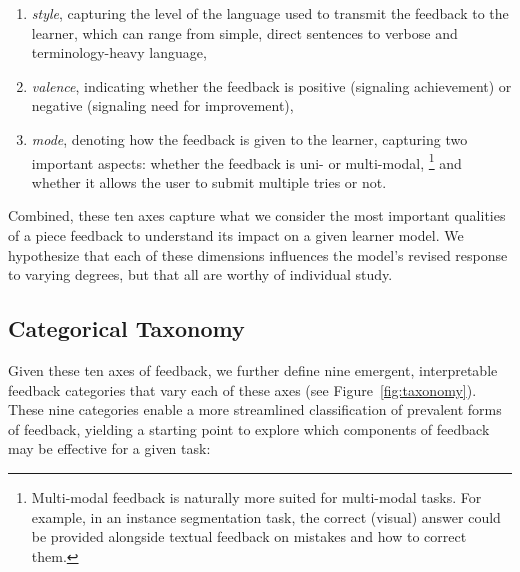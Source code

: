 \begin{enumerate}[itemsep=0.05em]
    \item \textit{style}, capturing the level of the language used to transmit the feedback to the learner, which can range from simple, direct sentences to verbose and terminology-heavy language, 
    \item \textit{valence}, indicating whether the feedback is positive (signaling achievement) or negative (signaling need for improvement),
    \item \textit{mode}, denoting how the feedback is given to the learner, capturing two important aspects: whether the feedback is uni- or multi-modal, \footnote{Multi-modal feedback is naturally more suited for multi-modal tasks. For example, in an instance segmentation task, the correct (visual) answer could be provided alongside textual feedback on mistakes and how to correct them.} and whether it allows the user to submit multiple tries or not.
\end{enumerate}

\noindent Combined, these ten axes capture what we consider the most important qualities of a piece feedback to understand its impact on a given learner model. We hypothesize that each of these dimensions influences the model's revised response to varying degrees, but that all are worthy of individual study.

\subsection{Categorical Taxonomy}
\label{ssec:categorical_taxonomy}
Given these ten axes of feedback, we further define nine emergent, interpretable feedback categories that vary each of these axes (see Figure~\ref{fig:taxonomy}). These nine categories enable a more streamlined classification of prevalent forms of feedback, yielding a starting point to explore which components of feedback may be effective for a given task:

